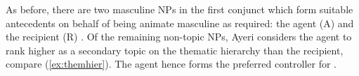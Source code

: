 \begin{figure}
\begin{morphlex}
\pex\label{ex:animgendclash}
\a {}

\a{}
\xe
\end{morphlex}
\end{figure}

As before, there are two masculine NPs in the first conjunct which form
suitable antecedents on behalf of being animate masculine as required: the
agent (A)  and the recipient (R) . Of the
remaining non-topic NPs, Ayeri considers the agent to rank higher as a
secondary topic on the thematic hierarchy than the recipient, compare 
(\ref{ex:themhier}). The agent hence forms the preferred controller for
.

